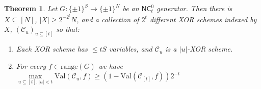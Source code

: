 \documentclass[11pt]{article}
\newtheorem{theorem}{Theorem}
\newcommand{\rng}{\mathrm{range}}
\newcommand{\N}{[N]}
\begin{document}
\begin{theorem}\label{thm:fourier}
Let $G: \{\pm 1\}^S \to \{\pm 1\}^N$ be an $\mathsf{NC}^0_t$ generator. Then there is $X \subseteq \N$, $|X| \geq 2^{-2^t}N$, and a collection of $2^{t}$ different XOR schemes indexed by $X$, $(\mathcal{C}_{u})_{ u \subseteq [t]}$ so that:
\begin{enumerate}
    \item Each XOR scheme has $\leq tS$ variables, and $\mathcal{C}_u$ is a $|u|$-XOR scheme.
    \item For every $f \in \rng(G)$ 
    we have
    $   \max\limits_{u \subseteq [t], |u| < t} \mathrm{Val}(\mathcal{C}_u,f) \geq (1- \mathrm{Val}(\mathcal{C}_{[t]},f))2^{-t}$
\end{enumerate}
\end{theorem}
\end{document}
